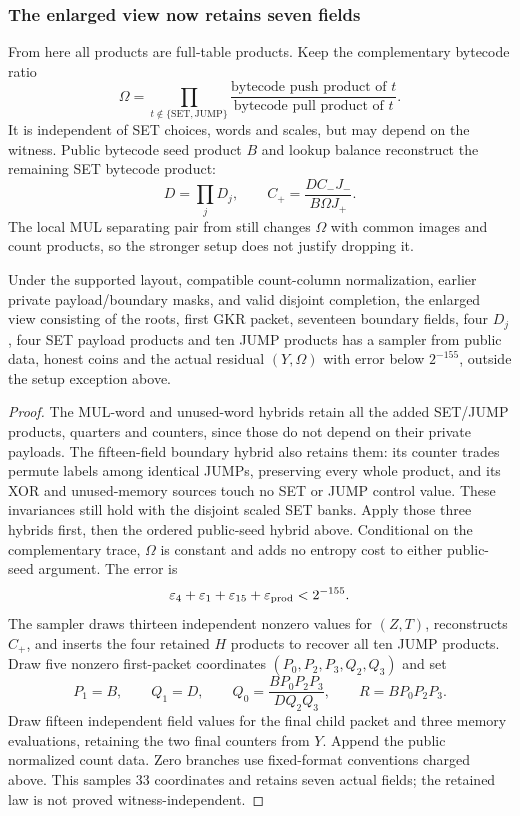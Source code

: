 \subsubsection{The enlarged view now retains seven fields}

From here all products are full-table products. Keep the complementary bytecode ratio
\[
 \Omega=\prod_{t\notin\{\mathrm{SET},\mathrm{JUMP}\}}
 \frac{\text{bytecode push product of }t}{\text{bytecode pull product of }t}.
\]
It is independent of SET choices, words and scales, but may depend on the witness. Public bytecode seed product $B$ and lookup balance reconstruct the remaining SET bytecode product:
\[
 D=\prod_jD_j,\qquad C_+=\frac{D C_-J_-}{B\Omega J_+}.
\]
The local MUL separating pair from  still changes $\Omega$ with common images and count products, so the stronger setup does not justify dropping it.

\begin{proposition}
Under the supported layout, compatible count-column normalization, earlier private payload/boundary masks, and valid disjoint completion, the enlarged view consisting of the roots, first GKR packet, seventeen boundary fields, four $D_j$, four SET payload products and ten JUMP products has a sampler from public data, honest coins and the actual residual $(Y,\Omega)$ with error below $2^{-155}$, outside the setup exception above.
\end{proposition}
\begin{proof}
The MUL-word and unused-word hybrids retain all the added SET/JUMP products, quarters and counters, since those do not depend on their private payloads. The fifteen-field boundary hybrid also retains them: its counter trades permute labels among identical JUMPs, preserving every whole product, and its XOR and unused-memory sources touch no SET or JUMP control value. These invariances still hold with the disjoint scaled SET banks. Apply those three hybrids first, then the ordered public-seed hybrid above. Conditional on the complementary trace, $\Omega$ is constant and adds no entropy cost to either public-seed argument. The error is
\[
 \varepsilon_4+\varepsilon_1+\varepsilon_{15}+\varepsilon_{\rm prod}<2^{-155}.
\]
The sampler draws thirteen independent nonzero values for $(Z,T)$, reconstructs $C_+$, and inserts the four retained $H$ products to recover all ten JUMP products. Draw five nonzero first-packet coordinates $(P_0,P_2,P_3,Q_2,Q_3)$ and set
\[
 P_1=B,\qquad Q_1=D,\qquad
 Q_0=\frac{BP_0P_2P_3}{DQ_2Q_3},\qquad R=BP_0P_2P_3.
\]
Draw fifteen independent field values for the final child packet and three memory evaluations, retaining the two final counters from $Y$. Append the public normalized count data. Zero branches use fixed-format conventions charged above. This samples $33$ coordinates and retains seven actual fields; the retained law is not proved witness-independent.
\end{proof}


